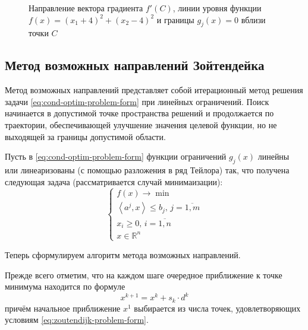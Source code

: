 \documentclass{article}
\renewcommand{\leq}{\leqslant}
\renewcommand{\geq}{\geqslant}
\newcommand{\set}[1]{\mathbb{#1}}
\newcommand{\mul}{\cdot}
\newcommand{\scalmult}[1]{{\left \langle #1 \right \rangle}}
\theoremstyle{remark}
\theoremstyle{definition}
\numberwithin{equation}{section}
\begin{document}
\begin{itemize}
\begin{figure}[!h]
    \caption{Направление вектора градиента $f'(C)$, линии уровня
      функции $f(x) = (x_1+4)^2+(x_2-4)^2$ и границы $g_j(x)=0$ вблизи
      точки $C$}
    \label{fig:cond-optim-zoom}
  \end{figure}
\end{itemize}

\clearpage
\subsection{Метод возможных направлений Зойтендейка}
\label{sec:zoutendijk}

Метод возможных направлений представляет собой итерационный метод
решения задачи \eqref{eq:cond-optim-problem-form} при линейных
ограничений. Поиск начинается в допустимой точке пространства решений
и продолжается по траектории, обеспечивающей улучшение значения
целевой функции, но не выходящей за границы допустимой области.

Пусть в \eqref{eq:cond-optim-problem-form} функции ограничений
$g_j(x)$ линейны или линеаризованы (с помощью разложения в ряд
Тейлора) так, что получена следующая задача (рассматривается случай
минимаизации):
\begin{equation}
  \label{eq:zoutendijk-problem-form}
  \begin{cases}
    f(x) \to \min \\
    \scalmult{a^j,x} \leq b_j,\, j=\overline{1,m} \\
    x_i \geq 0,\, i=\overline{1,n} \\
    x \in \set{R}^n
  \end{cases}
\end{equation}

Теперь сформулируем алгоритм метода возможных направлений.

Прежде всего отметим, что на каждом шаге очередное приближение к точке
минимума находится по формуле
\begin{equation}
  \label{eq:zoutendijk-iter}
  x^{k+1} = x^k + s_k \mul d^k
\end{equation}
причём начальное приближение $x^1$ выбирается из числа точек,
удовлетворяющих условиям \eqref{eq:zoutendijk-problem-form}.
\end{document}
